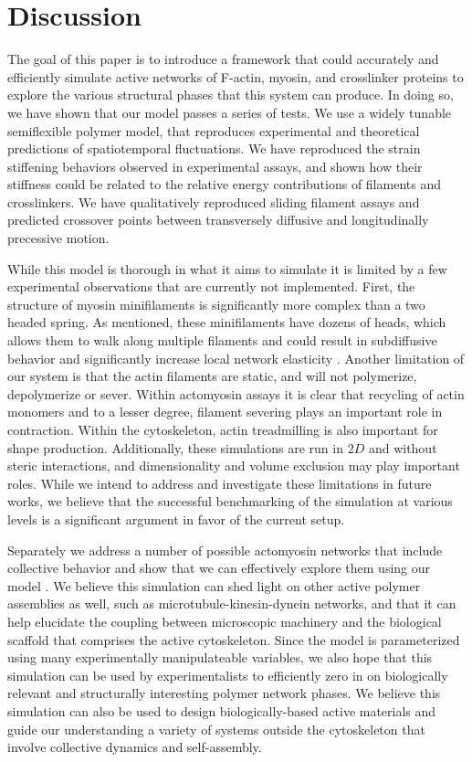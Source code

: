 \documentclass[12pt]{article}
\begin{document}
\section{Discussion}
The goal of this paper is to introduce a framework that could accurately and efficiently simulate active networks of F-actin,
myosin, and crosslinker proteins to explore the various structural phases that this system can produce. In doing so, we
have shown that our model passes a series of tests. We use a widely tunable semiflexible polymer model, that
reproduces experimental and theoretical predictions of spatiotemporal fluctuations. We have reproduced the strain stiffening
behaviors observed in experimental assays, and shown how their stiffness could be related to the relative energy
contributions of filaments and crosslinkers. We have qualitatively reproduced sliding filament assays and predicted
crossover points between transversely diffusive and longitudinally precessive motion. 
\par
While this model is thorough in what it aims to simulate it is limited by a few experimental observations that are
currently not implemented. First, the structure of myosin minifilaments is significantly more complex than a two headed
spring. As mentioned, these minifilaments have dozens of heads, which allows them to walk along multiple filaments and
could result in subdiffusive behavior \cite{scholz2016} and significantly increase local network elasticity
\cite{murrellTalk}.
Another limitation of our system is that the actin filaments are static, and will not polymerize, depolymerize or
sever. Within actomyosin assays it is clear that recycling of actin monomers and to a lesser degree, filament severing 
plays an important role in contraction\cite{murrell2012}. Within the cytoskeleton, actin treadmilling is also important
for shape production. Additionally, these simulations are run in $2D$ and without steric interactions, and
dimensionality and volume exclusion may play important roles. While we intend to address and investigate these limitations in future
works, we believe that the successful benchmarking of the simulation at various levels is a significant argument in favor of the
current setup.
\par 
Separately we address a number of possible actomyosin networks that include collective behavior 
and show that we can effectively explore them using our model \cite{freedman2016,stam2016}.
We believe this simulation can shed light on other active polymer assemblies as well,
such as microtubule-kinesin-dynein networks, and that it can help 
elucidate the coupling between microscopic machinery and the biological scaffold 
that comprises the active cytoskeleton. Since the model is parameterized using many 
experimentally manipulateable variables, we also hope that this simulation can be used
by experimentalists to efficiently zero in on biologically relevant and structurally interesting
polymer network phases. 
We believe this simulation can also be used to design biologically-based active
materials and guide our understanding a variety of systems outside the 
cytoskeleton that involve collective dynamics and self-assembly.
\end{document}
